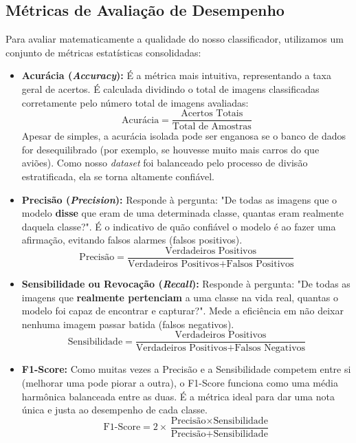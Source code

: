 \documentclass[12pt,a4paper]{article}
\begin{document}
\subsection{Métricas de Avaliação de Desempenho}
Para avaliar matematicamente a qualidade do nosso classificador, utilizamos um conjunto de métricas estatísticas consolidadas:

\begin{itemize}
    \item \textbf{Acurácia (\textit{Accuracy}):} É a métrica mais intuitiva, representando a taxa geral de acertos. É calculada dividindo o total de imagens classificadas corretamente pelo número total de imagens avaliadas:
    \begin{equation}
    \text{Acurácia} = \frac{\text{Acertos Totais}}{\text{Total de Amostras}}
    \end{equation}
    Apesar de simples, a acurácia isolada pode ser enganosa se o banco de dados for desequilibrado (por exemplo, se houvesse muito mais carros do que aviões). Como nosso \textit{dataset} foi balanceado pelo processo de divisão estratificada, ela se torna altamente confiável.

    \item \textbf{Precisão (\textit{Precision}):} Responde à pergunta: "De todas as imagens que o modelo \textbf{disse} que eram de uma determinada classe, quantas eram realmente daquela classe?". É o indicativo de quão confiável o modelo é ao fazer uma afirmação, evitando falsos alarmes (falsos positivos).
    \begin{equation}
    \text{Precisão} = \frac{\text{Verdadeiros Positivos}}{\text{Verdadeiros Positivos} + \text{Falsos Positivos}}
    \end{equation}

    \item \textbf{Sensibilidade ou Revocação (\textit{Recall}):} Responde à pergunta: "De todas as imagens que \textbf{realmente pertenciam} a uma classe na vida real, quantas o modelo foi capaz de encontrar e capturar?". Mede a eficiência em não deixar nenhuma imagem passar batida (falsos negativos).
    \begin{equation}
    \text{Sensibilidade} = \frac{\text{Verdadeiros Positivos}}{\text{Verdadeiros Positivos} + \text{Falsos Negativos}}
    \end{equation}

    \item \textbf{F1-Score:} Como muitas vezes a Precisão e a Sensibilidade competem entre si (melhorar uma pode piorar a outra), o F1-Score funciona como uma média harmônica balanceada entre as duas. É a métrica ideal para dar uma nota única e justa ao desempenho de cada classe.
    \begin{equation}
    \text{F1-Score} = 2 \times \frac{\text{Precisão} \times \text{Sensibilidade}}{\text{Precisão} + \text{Sensibilidade}}
    \end{equation}


\end{itemize}
\end{document}

